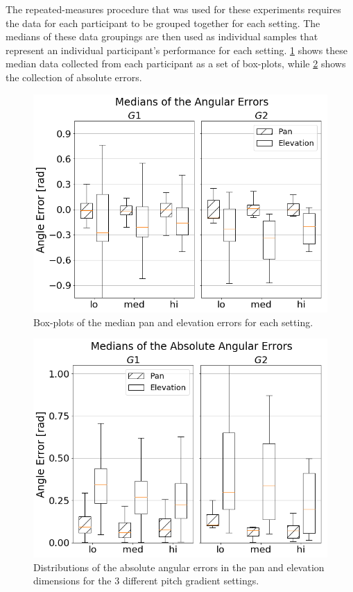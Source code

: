 \documentclass{article}
\begin{document}
The repeated-measures procedure that was used for these experiments requires the data for each participant to be grouped together for each setting.
The medians of these data groupings are then used as individual samples that represent an individual participant's performance for each setting.
\cref{fig:target-boxplot-error} shows these median data collected from each participant as a set of box-plots, while \cref{fig:target-boxplot-absolute-errors} shows the collection of absolute errors.

\begin{figure}
  \centering
  \includegraphics[width=1.0\textwidth]{figures/boxplot_target_search_median_error.png}
  \caption{Box-plots of the median pan and elevation errors for each setting. }\label{fig:target-boxplot-error}
\end{figure}

\begin{figure}
  \centering
  \includegraphics[width=1.0\textwidth]{figures/boxplot_target_search_absolute_median_error.png}
  \caption{Distributions of the absolute angular errors in the pan and elevation dimensions for the 3 different pitch gradient settings. }\label{fig:target-boxplot-absolute-errors}
\end{figure}
\end{document}
